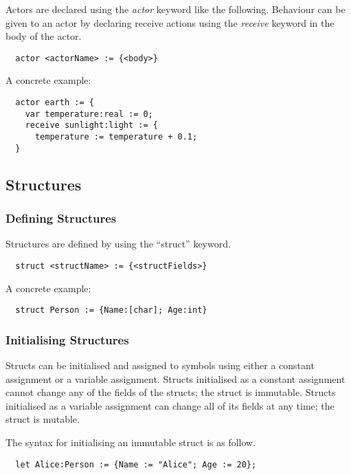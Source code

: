 Actors are declared using the \emph{actor} keyword like the following. Behaviour can be given to an actor by declaring receive actions using the \emph{receive} keyword in the body of the actor.

\begin{verbatim}
  actor <actorName> := {<body>}
\end{verbatim}

A concrete example:

\begin{verbatim}
  actor earth := {
    var temperature:real := 0;
    receive sunlight:light := {
      temperature := temperature + 0.1;
  }
\end{verbatim}

\subsection{Structures}
\label{sec:structs}

\subsubsection{Defining Structures}
\label{sec:defStructures}

Structures are defined by using the \enquote{struct} keyword. 

\begin{verbatim}
  struct <structName> := {<structFields>}
\end{verbatim}

A concrete example:

\begin{verbatim}
  struct Person := {Name:[char]; Age:int}
\end{verbatim}

\subsubsection{Initialising Structures}
\label{sec:initStructures}

Structs can be initialised and assigned to symbols using either a constant assignment or a variable assignment. Structs initialised as a constant assignment cannot change any of the fields of the structs; the struct is immutable. Structs initialised as a variable assignment can change all of its fields at any time; the struct is mutable.

The syntax for initialising an immutable struct is as follow.

\begin{verbatim}
  let Alice:Person := {Name := "Alice"; Age := 20};
\end{verbatim}

